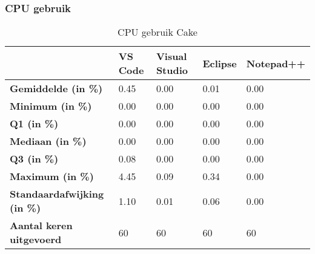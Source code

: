 \newpage

\subsubsection{CPU gebruik}
\begin{table}[h]
	\centering
	\begin{tabular}{ l l l l l }
		\hline
		                                    & \textbf{VS Code} & \textbf{Visual Studio} & \textbf{Eclipse} & \textbf{Notepad++} \\
		\hline
		\textbf{Gemiddelde (in \%)}         & 0.45             & 0.00                   & 0.01             & 0.00               \\[1ex]

		\textbf{Minimum (in \%) }           & 0.00             & 0.00                   & 0.00             & 0.00               \\
		\textbf{Q1 (in \%)}                 & 0.00             & 0.00                   & 0.00             & 0.00               \\
		\textbf{Mediaan (in \%)}            & 0.00             & 0.00                   & 0.00             & 0.00               \\
		\textbf{Q3 (in \%)}                 & 0.08             & 0.00                   & 0.00             & 0.00               \\
		\textbf{Maximum (in \%)}            & 4.45             & 0.09                   & 0.34             & 0.00               \\[1ex]

		\textbf{Standaardafwijking (in \%)} & 1.10             & 0.01                   & 0.06             & 0.00               \\
		\textbf{Aantal keren uitgevoerd}    & 60               & 60                     & 60               & 60                 \\
		\hline
	\end{tabular}
	\caption{CPU gebruik Cake}
	\label{tab:resultatenCPUCake}
\end{table}

